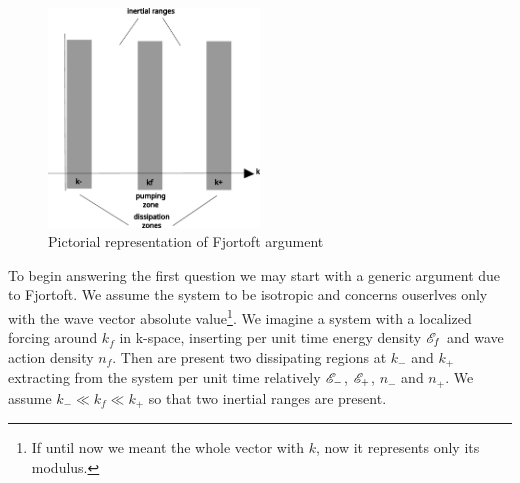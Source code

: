 \begin{figure} %
    \centering
    \includegraphics[width=0.5\textwidth]{images/Fjortoft.pdf}
    \caption{Pictorial representation of Fjortoft argument}
\end{figure}

To begin answering the first question we may start with a generic argument due to Fjortoft. We assume the system to be isotropic and concerns ouserlves only with the 
wave vector absolute value\footnote{If until now we meant the whole vector with $k$, now it represents only its modulus.}. We imagine a system with a localized forcing 
around $k_f$ in k-space, inserting per unit time energy density $\mathscr{E}_f$ and wave action density $n_f$. Then are present two dissipating regions at $k_-$ and $k_+$
extracting from the system per unit time relatively $\mathscr{E}_-$, $\mathscr{E}_+$, $n_-$ and $n_+$. We assume $k_- \ll k_f \ll k_+$ so that two inertial ranges are present.\\


